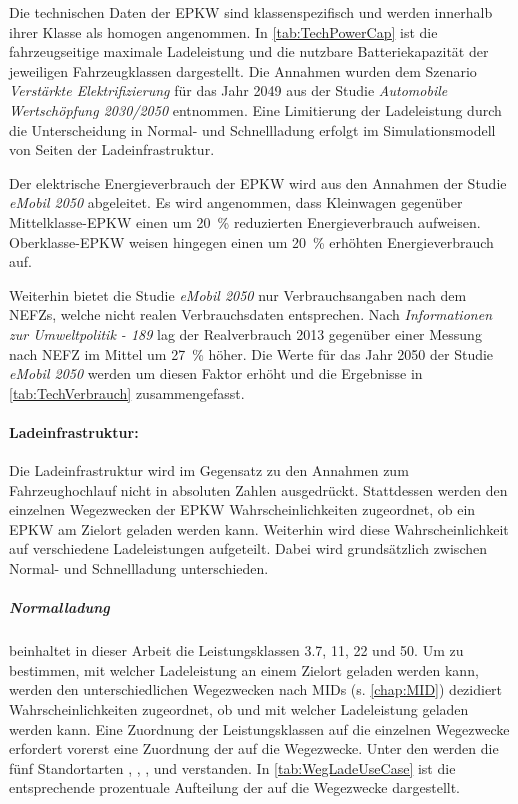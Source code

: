 Die technischen Daten der \gls{EPKW} sind klassenspezifisch und werden innerhalb ihrer Klasse als homogen angenommen.
In \autoref{tab:TechPowerCap} ist die fahrzeugseitige maximale Ladeleistung und die nutzbare Batteriekapazität der jeweiligen Fahrzeugklassen dargestellt.
Die Annahmen wurden dem Szenario \textit{Verstärkte Elektrifizierung} für das Jahr \num{2049} aus der Studie \textit{Automobile Wertschöpfung 2030/2050} \cite{Kaul2019} entnommen.
Eine Limitierung der Ladeleistung durch die Unterscheidung in Normal- und Schnellladung erfolgt im Simulationsmodell von Seiten der Ladeinfrastruktur.



Der elektrische Energieverbrauch der \gls{EPKW} wird aus den Annahmen der Studie \textit{eMobil 2050} \cite{Hacker2014} abgeleitet.
Es wird angenommen, dass Kleinwagen gegenüber Mittelklasse-\gls{EPKW} einen um \SI{20}{\percent} reduzierten Energieverbrauch aufweisen.
Oberklasse-\gls{EPKW} weisen hingegen einen um \SI{20}{\percent} erhöhten Energieverbrauch auf.\medskip

Weiterhin bietet die Studie \textit{eMobil 2050} nur Verbrauchsangaben nach dem \glspl{NEFZ}, welche nicht realen Verbrauchsdaten entsprechen.
Nach \textit{Informationen zur Umweltpolitik - 189} \cite{Heinfellner2015} lag der Realverbrauch \num{2013} gegenüber einer Messung nach \gls{NEFZ} im Mittel um \SI{27}{\percent} höher.
Die Werte für das Jahr \num{2050} der Studie \textit{eMobil 2050} werden um diesen Faktor erhöht und die Ergebnisse in \autoref{tab:TechVerbrauch} zusammengefasst.




\paragraph{Ladeinfrastruktur:}

Die Ladeinfrastruktur wird im Gegensatz zu den Annahmen zum Fahrzeughochlauf nicht in absoluten Zahlen ausgedrückt.
Stattdessen werden den einzelnen Wegezwecken der \gls{EPKW} Wahrscheinlichkeiten zugeordnet, ob ein \gls{EPKW} am Zielort geladen werden kann.
Weiterhin wird diese Wahrscheinlichkeit auf verschiedene Ladeleistungen aufgeteilt.
Dabei wird grundsätzlich zwischen Normal- und Schnellladung unterschieden.


\subparagraph{Normalladung} beinhaltet in dieser Arbeit die Leistungsklassen \SI{3.7}{\kw}, \SI{11}{\kw}, \SI{22}{\kw} und \SI{50}{\kw}.
Um zu bestimmen, mit welcher Ladeleistung an einem Zielort geladen werden kann, werden den unterschiedlichen Wegezwecken nach \glspl{MID} (s. \autoref{chap:MID}) dezidiert Wahrscheinlichkeiten zugeordnet, ob und mit welcher Ladeleistung geladen werden kann.
Eine Zuordnung der Leistungsklassen auf die einzelnen Wegezwecke erfordert vorerst eine Zuordnung der \UCs auf die Wegezwecke.
Unter den \UCs werden die fünf Standortarten \Eigenheimdot, \Wohnanlagedot, \Firmeparkplatzdot, \Gewerbeparkplatz und \Straszenrand verstanden.
In \autoref{tab:WegLadeUseCase} ist die entsprechende prozentuale Aufteilung der \UCs auf die Wegezwecke dargestellt.

